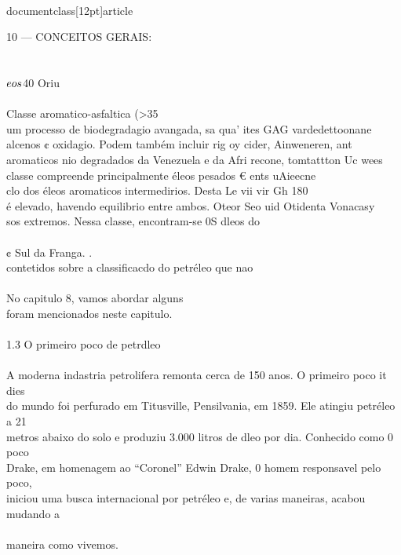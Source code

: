 \\documentclass[12pt]{article}
\begin{document}
{10 — CONCEITOS GERAIS:\\
\\
\\$ eos \\$40 Oriu\\
\\
Classe aromatico-asfaltica (>35\\%
um processo de biodegradagio avangada, sa qua’ ites GAG vardedettoonane\\
alcenos ¢ oxidagio. Podem também incluir rig oy cider, Ainweneren, ant\\
aromaticos nio degradados da Venezuela e da Afri recone, tomtattton Uc wees\\
classe compreende principalmente éleos pesados € ents uAieecne\\
clo dos éleos aromaticos intermedirios. Desta Le vii vir Gh 180\\%
é elevado, havendo equilibrio entre ambos. Oteor Seo uid Otidenta Vonacasy\\
sos extremos. Nessa classe, encontram-se 0S dleos do\\
\\
¢ Sul da Franga. .\\
contetidos sobre a classificacdo do petréleo que nao\\
\\
No capitulo 8, vamos abordar alguns\\
foram mencionados neste capitulo.\\
\\
1.3 O primeiro poco de petrdleo\\
\\
A moderna indastria petrolifera remonta cerca de 150 anos. O primeiro poco it dies\\
do mundo foi perfurado em Titusville, Pensilvania, em 1859. Ele atingiu petréleo a 21\\
metros abaixo do solo e produziu 3.000 litros de dleo por dia. Conhecido como 0 poco\\
Drake, em homenagem ao “Coronel” Edwin Drake, 0 homem responsavel pelo poco,\\
iniciou uma busca internacional por petréleo e, de varias maneiras, acabou mudando a\\
\\
maneira como vivemos.\\
}
\end{document}

